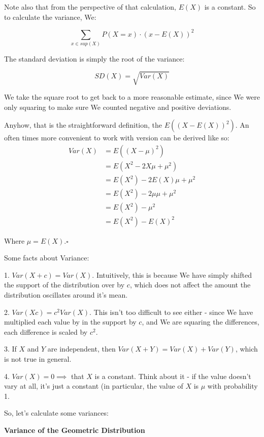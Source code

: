 \documentclass{article}
\newcommand{\qed}{\hfill$\square$}
\begin{document}
		Note also that from the perspective of that calculation, $E(X)$ is a constant. So to calculate the variance, We:
		
		$$\sum_{x \in sup(X)} P(X = x) \cdot (x - E(X))^2$$
		
		The standard deviation is simply the root of the variance:
		
		$$SD(X) = \sqrt{Var(X)}$$
		
		We take the square root to get back to a more reasonable estimate, since We were only squaring to make sure We counted negative and positive deviations.
		
		Anyhow, that is the straightforward definition, the $E((X - E(X))^2)$. An often times more convenient to work with version can be derived like so:
		\begin{equation*}		
			\begin{split}
				Var(X) 	&= E((X - \mu)^2) \\
						&= E(X^2 - 2X\mu + \mu^2) \\ 
						&= E(X^2) - 2E(X)\mu + \mu^2 \\
						&= E(X^2) - 2\mu \mu + \mu^2 \\
						&= E(X^2) - \mu^2 \\
						& = E(X^2) - E(X)^2		
			\end{split}
		\end{equation*}
		
		Where $\mu = E(X)$.\qed
		
		Some facts about Variance:
		
		1. $Var(X + c) = Var(X)$. Intuitively, this is because We have simply shifted the support of the distribution over by $c$, which does not affect the amount the distribution oscillates around it's mean.
		
		2. $Var(Xc) = c^2Var(X)$. This isn't too difficult to see either - since We have multiplied each value by in the support by $c$, and We are squaring the differences, each difference is scaled by $c^2$.
		
		3. If $X$ and $Y$ are independent, then $Var(X+Y) = Var(X) + Var(Y)$, which is not true in general.
		
		4. $Var(X) = 0 \implies $ that $X$ is a constant. Think about it - if the value doesn't vary at all, it's just a constant (in particular, the value of $X$ is $\mu$ with probability 1.
		
		So, let's calculate some variances:
		
		\textbf{Variance of the Geometric Distribution}
		
\end{document}

